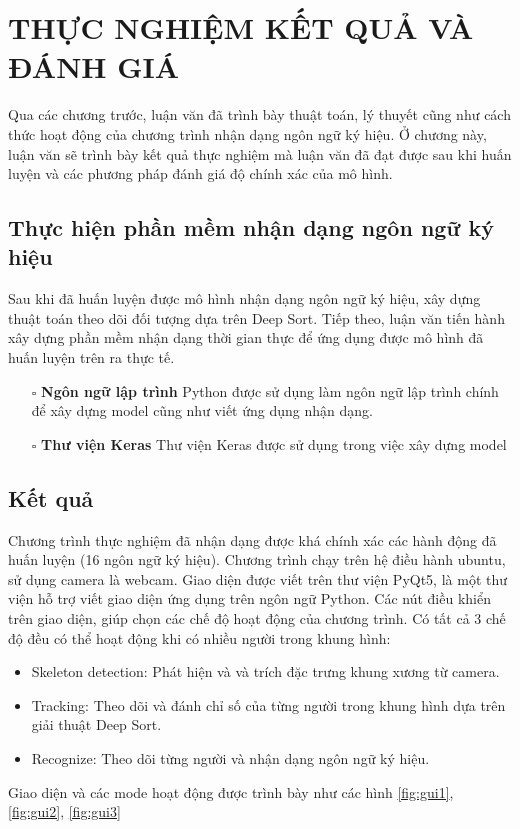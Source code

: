 \chapter{THỰC NGHIỆM KẾT QUẢ VÀ ĐÁNH GIÁ}
Qua các chương trước, luận văn đã trình bày thuật toán, lý thuyết cũng như cách thức hoạt động của chương trình nhận dạng ngôn ngữ ký hiệu. Ở chương này, luận văn sẽ trình bày kết quả thực nghiệm mà luận văn đã đạt được sau khi huấn luyện và các phương pháp đánh giá độ chính xác của mô hình.
\section{Thực hiện phần mềm nhận dạng ngôn ngữ ký hiệu}
Sau khi đã huấn luyện được mô hình nhận dạng ngôn ngữ ký hiệu, xây dựng thuật toán theo dõi đối tượng dựa trên Deep Sort. Tiếp theo, luận văn tiến hành xây dựng phần mềm nhận dạng thời gian thực để ứng dụng được mô hình đã huấn luyện trên ra thực tế.
\begin{itemize}
\item[$\square$] \textbf{Ngôn ngữ lập trình}
Python được sử dụng làm ngôn ngữ lập trình chính để xây dựng model cũng như viết ứng dụng nhận dạng.
\item[$\square$] \textbf{Thư viện Keras}
Thư viện Keras được sử dụng trong việc xây dựng model
\end{itemize}


\section{Kết quả}
Chương trình thực nghiệm đã nhận dạng được khá chính xác các hành động đã huấn luyện (16 ngôn ngữ ký hiệu). Chương trình chạy trên hệ điều hành ubuntu, sử dụng camera là webcam. Giao diện được viết trên thư viện PyQt5, là một thư viện hỗ trợ viết giao diện ứng dụng trên ngôn ngữ Python. Các nút điều khiển trên giao diện, giúp chọn các chế độ hoạt động của chương trình. Có tất cả 3 chế độ đều có thể hoạt động khi có nhiều người trong khung hình:
\begin{itemize}
\item Skeleton detection: Phát hiện và và trích đặc trưng khung xương từ camera.
\item Tracking: Theo dõi và đánh chỉ số của từng người trong khung hình dựa trên giải thuật Deep Sort.
\item Recognize: Theo dõi từng người và nhận dạng ngôn ngữ ký hiệu.
\end{itemize}
Giao diện và các mode hoạt động được trình bày như các hình \ref{fig:gui1}, \ref{fig:gui2}, \ref{fig:gui3}

